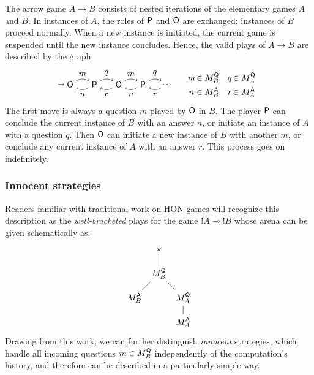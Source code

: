 The arrow game $A \rightarrow B$ consists of
nested iterations of the elementary games $A$ and $B$.
In instances of $A$, the roles of $ \mathsf{P} $ and $ \mathsf{O} $ are exchanged;
instances of $B$ proceed normally.
When a new instance is initiated,
the current game is suspended
until the new instance concludes.
Hence,
the valid plays of $A \rightarrow B$
are described by the graph:
\[
  \begin{tikzpicture}[baseline=(O1.base)]
    \node (O1) at (0,0) {\kw{O}};
    \node (P1) at (1,0) {\kw{P}};
    \node (O2) at (2,0) {\kw{O}};
    \node (P2) at (3,0) {\kw{P}};
    \node (O3) at (4,0) {$\ldots$};
    \path [->] (-0.5,0) edge (O1);
    \path [->] (O1) edge[bend left] node[auto] {$m$} (P1);
    \path [->] (P1) edge[bend left] node[auto] {$n$} (O1);
    \path [->] (P1) edge[bend left] node[auto] {$q$} (O2);
    \path [->] (O2) edge[bend left] node[auto] {$r$} (P1);
    \path [->] (O2) edge[bend left] node[auto] {$m$} (P2);
    \path [->] (P2) edge[bend left] node[auto] {$n$} (O2);
    \path [->] (P2) edge[bend left] node[auto] {$q$} (O3);
    \path [->] (O3) edge[bend left] node[auto] {$r$} (P2);
  \end{tikzpicture}
  \quad
  \begin{array}{c@{\,}l@{\quad}c@{\,}l}
    m &\in M_B^\kw{Q} & q &\in M_A^\kw{Q} \\[1ex]
    n &\in M_B^\kw{A} & r &\in M_A^\kw{A}
  \end{array}
\]
The first move is always a question $m$ played by $ \mathsf{O} $ in $B$.
The player $ \mathsf{P} $ can conclude the current instance of $B$
with an answer $n$, or
initiate an instance of $A$
with a question $q$.
Then $ \mathsf{O} $ can initiate a new instance of $B$
with another $m$, or
conclude any current instance of $A$
with an answer $r$.
This process goes on indefinitely.


\subsubsection{Innocent strategies} %

Readers familiar with traditional work on HON games \cite{something}
will recognize this description
as the \emph{well-bracketed} plays for the game ${!}A \multimap {!}B$
whose arena can be given schematically as:
\[
  \begin{tikzpicture}
    \node (S) at (0,3) {$\star$};
    \node (BQ) at (0,2) {$M_B^\kw{Q}$};
    \node (BA) at (-1,1) {$M_B^\kw{A}$};
    \node (AQ) at (+1,1) {$M_A^\kw{Q}$};
    \node (AA) at (+1,0) {$M_A^\kw{A}$};
    \path (S) edge (BQ);
    \path (BQ) edge (BA);
    \path (BQ) edge (AQ);
    \path (AQ) edge (AA);
  \end{tikzpicture}
\]
Drawing from this work,
we can further distinguish \emph{innocent} strategies,
which handle all incoming questions $m \in M_B^{ \mathsf{Q} }$
independently of the computation's history,
and therefore can be described in a particularly simple way.

